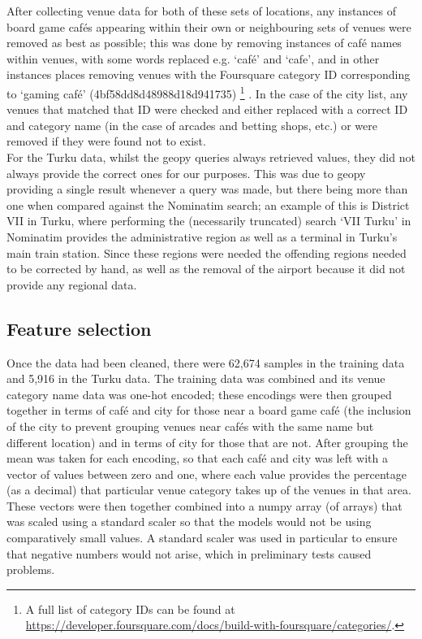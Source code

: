 \documentclass{article}
\begin{document}
    After collecting venue data for both of these sets of locations, any instances of board game caf\'es appearing within their own or neighbouring sets of venues were removed as best as possible; this was done by removing instances of caf\'e names within venues, with some words replaced e.g. `caf\'e' and `cafe', and in other instances places removing venues with the Foursquare category ID corresponding to `gaming caf\'e' (4bf58dd8d48988d18d941735)%
    \footnote{
        A full list of category IDs can be found at \url{https://developer.foursquare.com/docs/build-with-foursquare/categories/}.
    }%
    .
    In the case of the city list, any venues that matched that ID were checked and either replaced with a correct ID and category name (in the case of arcades and betting shops, etc.) or were removed if they were found not to exist.\\

    For the Turku data, whilst the geopy queries always retrieved values, they did not always provide the correct ones for our purposes. 
    This was due to geopy providing a single result whenever a query was made, but there being more than one when compared against the Nominatim search; an example of this is District VII in Turku, where performing the (necessarily truncated) search `VII Turku' in Nominatim provides the administrative region as well as a terminal in Turku's main train station. 
    Since these regions were needed the offending regions needed to be corrected by hand, as well as the removal of the airport because it did not provide any regional data.


    \subsection{Feature selection}

    Once the data had been cleaned, there were 62,674 samples in the training data and 5,916 in the Turku data.
    The training data was combined and its venue category name data was one-hot encoded; these encodings were then grouped together in terms of caf\'e and city for those near a board game caf\'e (the inclusion of the city to prevent grouping venues near caf\'es with the same name but different location) and in terms of city for those that are not.
    After grouping the mean was taken for each encoding, so that each caf\'e and city was left with a vector of values between zero and one, where each value provides the percentage (as a decimal) that particular venue category takes up of the venues in that area.
    These vectors were then together combined into a numpy array (of arrays) that was scaled using a standard scaler so that the models would not be using comparatively small values.
    A standard scaler was used in particular to ensure that negative numbers would not arise, which in preliminary tests caused problems.\\
\end{document}
